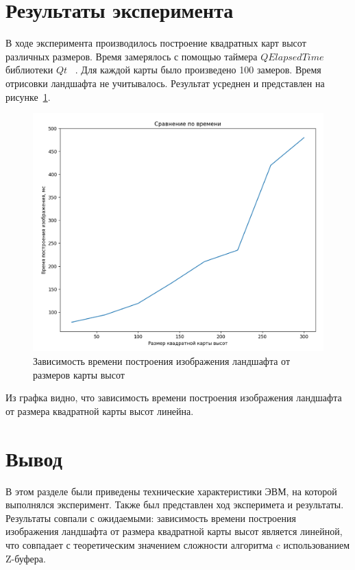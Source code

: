 \documentclass[a4paper, 14pt]{extreport}
\begin{document}
\section{Результаты эксперимента}

В ходе эксперимента производилось построение квадратных карт высот различных размеров. Время замерялось с помощью 
таймера $QElapsedTime$ библиотеки $Qt$~\cite{qt} . Для каждой карты было произведено 100 замеров. Время отрисовки 
ландшафта не учитывалось. Результат усреднен и представлен на рисунке~\ref{pict:graph}. 
\clearpage\begin{figure}[h]
	\centering
	\includegraphics[scale=0.6]{tools/graph.png}
	\caption{Зависимость времени построения изображения ландшафта от размеров карты высот}
	\label{pict:graph}
\end{figure}

Из графка видно, что зависимость времени построения изображения ландшафта от размера квадратной карты высот линейна.

\section{Вывод}

В этом разделе были приведены технические характеристики ЭВМ, на которой выполнялся эксперимент. Также был представлен
ход эксперимета и результаты. Результаты совпали с ожидаемыми: зависимость времени построения изображения ландшафта от
размера квадратной карты высот является линейной, что совпадает с теоретическим значением сложности алгоритма c
использованием Z-буфера.
\end{document}
